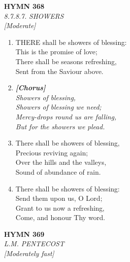 \documentclass[11pt,a4paper]{article}
\begin{document}
\newpage
\begin{center}
    {\Large \textbf{HYMN 368}}
    \\
    \textit{8.7.8.7. SHOWERS}
    \\
    \textit{\small [Moderate]}
\end{center}
\vspace{1em}

\begin{enumerate}
    \item THERE shall be showers of blessing: \\
        This is the promise of love; \\
        There shall be seasons refreshing, \\
        Sent from the Saviour above.

    \item[] \vspace{0.4em}
    \textbf{\textit{[Chorus]}} \\
    \textit{Showers of blessing,} \\
    \textit{Showers of blessing we need;} \\
    \textit{Mercy-drops round us are falling,} \\
    \textit{But for the showers we plead.}
    \vspace{0.4em}

    \item There shall be showers of blessing, \\
        Precious reviving again; \\
        Over the hills and the valleys, \\
        Sound of abundance of rain.

    \item There shall be showers of blessing: \\
        Send them upon us, O Lord; \\
        Grant to us now a refreshing, \\
        Come, and honour Thy word.

\end{enumerate}

\newpage
\begin{center}
    {\Large \textbf{HYMN 369}}
    \\
    \textit{L.M. PENTECOST}
    \\
    \textit{\small [Moderately fast]}
\end{center}
\vspace{1em}
\end{document}
